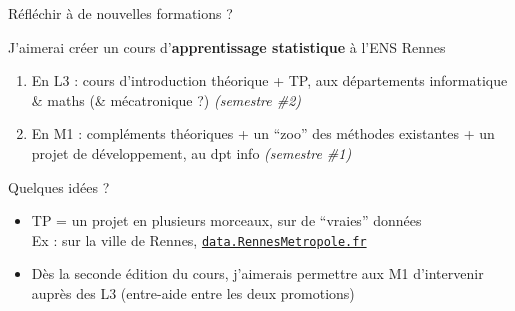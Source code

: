 \documentclass[11pt,english,ignorenonframetext,]{beamer}
\providecommand{\tightlist}{%
  \setlength{\itemsep}{0pt}\setlength{\parskip}{0pt}}
\begin{document}
\begin{frame}{Réfléchir à de nouvelles formations ? \hfill{} }

\pause

J'aimerai créer un cours d'\textcolor{ml}{\textbf{apprentissage statistique}} à l'ENS Rennes

\begin{enumerate}
[1.]
\tightlist
\item
  En L3 : cours d'introduction théorique + TP, aux départements \textcolor{info}{informatique} \& \textcolor{maths}{maths} (\& \textcolor{meca}{mécatronique} ?)
  \hfill{}
  \emph{(semestre \#2)}
\item
  En M1 : compléments théoriques + un ``zoo'' des méthodes existantes + un projet de développement, \textcolor{info}{au dpt info}
  \hfill{}
  \emph{(semestre \#1)}
\end{enumerate}

\pause

\begin{exampleblock}{Quelques idées ?}

\begin{itemize}
\tightlist
\item
  TP = un projet en plusieurs morceaux, sur de ``vraies'' données\\
  Ex : sur la ville de Rennes, \href{https://data.rennesmetropole.fr/}{\texttt{data.RennesMetropole.fr}}
\item
  Dès la seconde édition du cours, j'aimerais permettre aux M1
  d'intervenir auprès des L3
  (entre-aide entre les deux promotions)
\end{itemize}

\end{exampleblock}

\end{frame}
\end{document}
